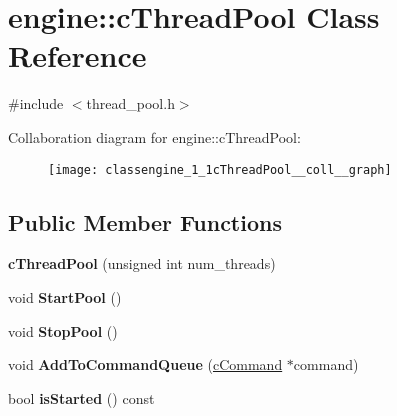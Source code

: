 \hypertarget{classengine_1_1cThreadPool}{\section{engine\-:\-:c\-Thread\-Pool \-Class \-Reference}
\label{classengine_1_1cThreadPool}
}


{\ttfamily \#include $<$thread\-\_\-pool.\-h$>$}



\-Collaboration diagram for engine\-:\-:c\-Thread\-Pool\-:
\nopagebreak
\begin{figure}[H]
\begin{center}
\leavevmode
\texttt{[image: classengine\_1\_1cThreadPool\_\_coll\_\_graph]}
\end{center}
\end{figure}
\subsection*{\-Public \-Member \-Functions}
\begin{DoxyCompactItemize}
\item 
\hypertarget{classengine_1_1cThreadPool_a1cef23416a63c1a652d07b074a40b42e}{{\bfseries c\-Thread\-Pool} (unsigned int num\-\_\-threads)}\label{classengine_1_1cThreadPool_a1cef23416a63c1a652d07b074a40b42e}

\item 
\hypertarget{classengine_1_1cThreadPool_a97cf0269aebd226e59d973a89181d709}{void {\bfseries \-Start\-Pool} ()}\label{classengine_1_1cThreadPool_a97cf0269aebd226e59d973a89181d709}

\item 
\hypertarget{classengine_1_1cThreadPool_aeafab9fa5546e10b0deebff1e8df60d9}{void {\bfseries \-Stop\-Pool} ()}\label{classengine_1_1cThreadPool_aeafab9fa5546e10b0deebff1e8df60d9}

\item 
\hypertarget{classengine_1_1cThreadPool_a0c20020f1a69f4ea0abdb75d1adde225}{void {\bfseries \-Add\-To\-Command\-Queue} (\hyperlink{classengine_1_1cCommand}{c\-Command} $\ast$command)}\label{classengine_1_1cThreadPool_a0c20020f1a69f4ea0abdb75d1adde225}

\item 
\hypertarget{classengine_1_1cThreadPool_a207b8bcf506d3cd151f0fc815772111c}{bool {\bfseries is\-Started} () const }\label{classengine_1_1cThreadPool_a207b8bcf506d3cd151f0fc815772111c}

\end{DoxyCompactItemize}
